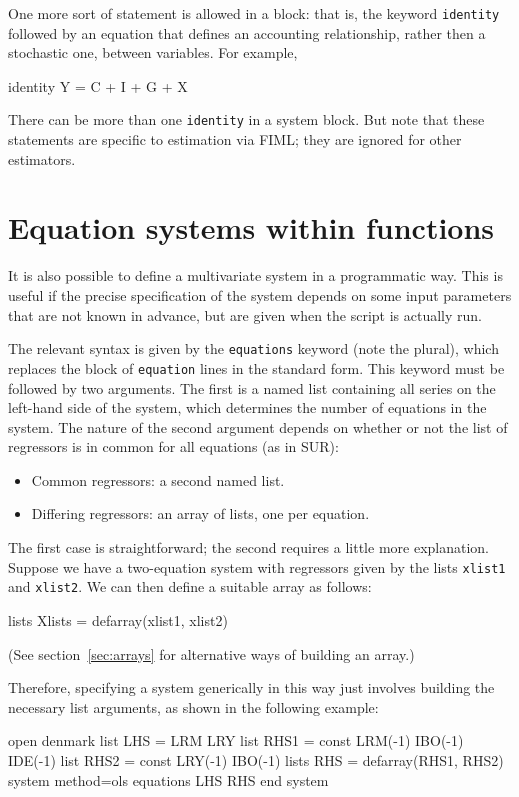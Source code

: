 One more sort of statement is allowed in a  block: that
is, the keyword \texttt{identity} followed by an equation that defines
an accounting relationship, rather then a stochastic one, between
variables. For example,

\begin{code}
  identity Y = C + I + G + X
\end{code}

There can be more than one \texttt{identity} in a system block. But
note that these statements are specific to estimation via FIML; they
are ignored for other estimators.

\section{Equation systems within functions}
\label{sec:system-in-func}

It is also possible to define a multivariate system in a programmatic
way. This is useful if the precise specification of the system depends
on some input parameters that are not known in advance, but are given
when the script is actually run.

The relevant syntax is given by the \texttt{equations} keyword (note
the plural), which replaces the block of \texttt{equation} lines in
the standard form. This keyword must be followed by two arguments. The
first is a named list containing all series on the left-hand side of
the system, which determines the number of equations in the
system. The nature of the second argument depends on whether or not
the list of regressors is in common for all equations (as in SUR):
\begin{itemize}
\item Common regressors: a second named list.
\item Differing regressors: an array of lists, one per equation.
\end{itemize}

The first case is straightforward; the second requires a little more
explanation. Suppose we have a two-equation system with regressors
given by the lists \texttt{xlist1} and \texttt{xlist2}. We can then
define a suitable array as follows:
\begin{code}
lists Xlists = defarray(xlist1, xlist2)
\end{code}
(See section~\ref{sec:arrays} for alternative ways of building an
array.)

Therefore, specifying a system generically in this way just involves 
building the necessary list arguments, as shown in the following
example:
\begin{code}
open denmark
list LHS = LRM LRY
list RHS1 = const LRM(-1) IBO(-1) IDE(-1)
list RHS2 = const LRY(-1) IBO(-1)
lists RHS = defarray(RHS1, RHS2)
system method=ols
     equations LHS RHS
end system
\end{code}

